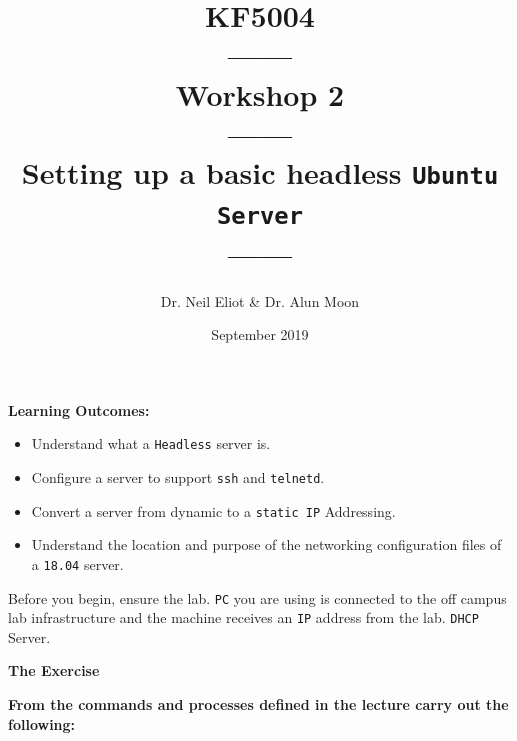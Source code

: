 \documentclass[11pt]{article}
\begin{document}
\author{Dr. Neil Eliot \& Dr. Alun Moon}
\title{KF5004\\------\\Workshop 2\\------\\Setting up a basic headless \texttt{Ubuntu Server}\\------}
\date{September 2019}
\maketitle

\newpage



\noindent\textbf{Learning Outcomes:}
\begin{itemize}
    \item Understand what a \texttt{Headless} server is.
    \item Configure a server to support \texttt{ssh} and \texttt{telnetd}.
    \item Convert a server from dynamic to a \texttt{static IP} Addressing.
    \item Understand the location and purpose of the networking configuration files of a \texttt{18.04} server.
\end{itemize}


\begin{tcolorbox}[title={\textbf{Important:}}]
    Before you begin, ensure the lab. \texttt{PC} you are using is connected to the off campus lab infrastructure and the machine receives an \texttt{IP} address from the lab. \texttt{DHCP} Server.
\end{tcolorbox}
\newpage

\noindent\textbf{The Exercise}\\
\begin{tcolorbox}[colback=blue!20]
    \noindent\textbf{From the commands and processes defined in the lecture carry out the following:}
\end{tcolorbox}
\end{document}
